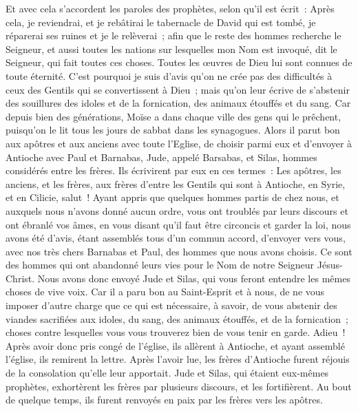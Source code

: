 \begin{multicols}{2}
Et avec cela s'accordent les paroles des prophètes, selon qu'il est écrit~:
Après cela, je reviendrai, et je rebâtirai le tabernacle de David qui est tombé, je réparerai ses ruines et je le relèverai~;
afin que le reste des hommes recherche le Seigneur, et aussi toutes les nations sur lesquelles mon Nom est invoqué, dit le Seigneur, qui fait toutes ces choses.
Toutes les œuvres de Dieu lui sont connues de toute éternité.
C'est pourquoi je suis d'avis qu'on ne crée pas des difficultés à ceux des Gentils qui se convertissent à Dieu~;
mais qu'on leur écrive de s'abstenir des souillures des idoles et de la fornication, des animaux étouffés et du sang.
Car depuis bien des générations, Moïse a dans chaque ville des gens qui le prêchent, puisqu'on le lit tous les jours de sabbat dans les synagogues.
Alors il parut bon aux apôtres et aux anciens avec toute l'Eglise, de choisir parmi eux et d'envoyer à Antioche avec Paul et Barnabas, Jude, appelé Barsabas, et Silas, hommes considérés entre les frères.
Ils écrivirent par eux en ces termes~: Les apôtres, les anciens, et les frères, aux frères d'entre les Gentils qui sont à Antioche, en Syrie, et en Cilicie, salut~!
Ayant appris que quelques hommes partis de chez nous, et auxquels nous n'avons donné aucun ordre, vous ont troublés par leurs discours et ont ébranlé vos âmes, en vous disant qu'il faut être circoncis et garder la loi,
nous avons été d'avis, étant assemblés tous d'un commun accord, d'envoyer vers vous, avec nos très chers Barnabas et Paul, des hommes que nous avons choisis. 
Ce sont des hommes qui ont abandonné leurs vies pour le Nom de notre Seigneur Jésus-Christ.
Nous avons donc envoyé Jude et Silas, qui vous feront entendre les mêmes choses de vive voix.
Car il a paru bon au Saint-Esprit et à nous, de ne vous imposer d'autre charge que ce qui est nécessaire,
à savoir, de vous abstenir des viandes sacrifiées aux idoles, du sang, des animaux étouffés, et de la fornication~; choses contre lesquelles vous vous trouverez bien de vous tenir en garde. Adieu~!
Après avoir donc pris congé de l'église, ils allèrent à Antioche, et ayant assemblé l'église, ils remirent la lettre.
Après l'avoir lue, les frères d'Antioche furent réjouis de la consolation qu'elle leur apportait.
Jude et Silas, qui étaient eux-mêmes prophètes, exhortèrent les frères par plusieurs discours, et les fortifièrent.
Au bout de quelque temps, ils furent renvoyés en paix par les frères vers les apôtres.

\end{multicols}
